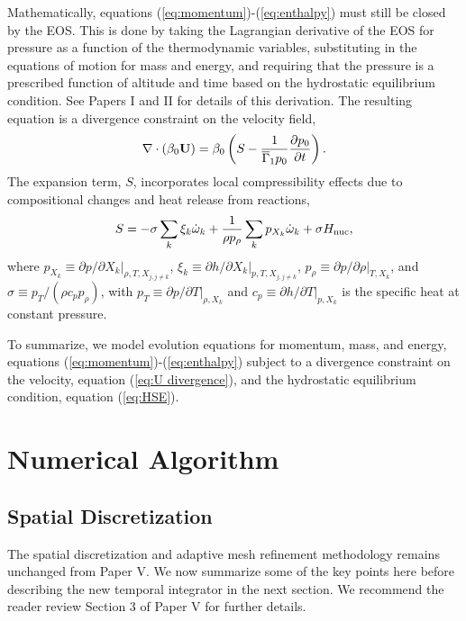 \documentclass{aastex62}
\newcommand{\Ub}{{\bf{U}}}
\newcommand{\gammaonebar}{\overline{\Gamma}_1}
\newcommand{\Hnuc}{H_{\rm nuc}}
\newcommand{\omegadot}{\dot\omega}
\begin{document}
Mathematically, equations (\ref{eq:momentum})-(\ref{eq:enthalpy}) must still be closed by the EOS.
This is done by taking the Lagrangian derivative of the EOS for pressure as a function of the thermodynamic variables,
substituting in the equations of motion for mass and energy,
and requiring that the pressure is a prescribed function of altitude and time based on the hydrostatic equilibrium condition.
See Papers I and II for details of this derivation.
The resulting equation is a divergence constraint on the velocity field,
\begin{equation}
\nabla\cdot(\beta_0\Ub) = \beta_0\left(S - \frac{1}{\gammaonebar p_0}\frac{\partial p_0}{\partial t}\right).\label{eq:U divergence}
\end{equation}
The expansion term, $S$, incorporates local compressibility effects due to compositional changes and heat release from reactions,
\begin{equation}
S = -\sigma\sum_k\xi_k\omegadot_k + \frac{1}{\rho p_\rho}\sum_k p_{X_k}\omegadot_k + \sigma\Hnuc,\label{eq:S}
\end{equation}
where
$p_{X_k} \equiv \left. \partial p / \partial X_k \right|_{\rho,T,X_{j,j\ne k}}$,
$\xi_k \equiv \left. \partial h /\partial X_k \right |_{p,T,X_{j,j\ne k}}$,
$p_\rho \equiv \left.\partial p/\partial \rho \right |_{T, X_k}$, and
$\sigma \equiv p_T/(\rho c_p p_\rho)$, with $p_T \equiv \left. \partial p / \partial
T \right|_{\rho, X_k}$ and $c_p \equiv \left.  \partial h / \partial T
\right|_{p,X_k}$ is the specific heat at constant pressure.

To summarize, we model evolution equations for momentum, mass, and energy, equations (\ref{eq:momentum})-(\ref{eq:enthalpy}) subject to a divergence constraint on the velocity, equation (\ref{eq:U divergence}), and the hydrostatic equilibrium condition, equation (\ref{eq:HSE}).


\section{Numerical Algorithm}\label{eq:algorithm}
\subsection{Spatial Discretization}\label{Sec:Spatial}
The spatial discretization and adaptive mesh refinement methodology remains unchanged from Paper V.
We now summarize some of the key points here before describing the new temporal integrator in the next section.
We recommend the reader review Section 3 of Paper V for further details.
\end{document}
